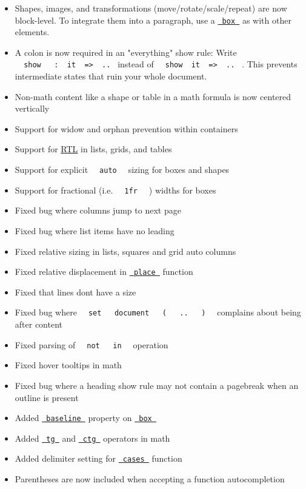 \begin{itemize}
\tightlist
\item
  Shapes, images, and transformations (move/rotate/scale/repeat) are now
  block-level. To integrate them into a paragraph, use a
  \href{/docs/reference/layout/box/}{\texttt{\ box\ }} as with other
  elements.
\item
  A colon is now required in an "everything" show rule: Write
  \texttt{\ }{\texttt{\ show\ }}\texttt{\ }{\texttt{\ :\ }}\texttt{\ it\ }{\texttt{\ =\textgreater{}\ }}\texttt{\ ..\ }
  instead of
  \texttt{\ }{\texttt{\ show\ }}\texttt{\ it\ }{\texttt{\ =\textgreater{}\ }}\texttt{\ ..\ }
  . This prevents intermediate states that ruin your whole document.
\item
  Non-math content like a shape or table in a math formula is now
  centered vertically
\item
  Support for widow and orphan prevention within containers
\item
  Support for \href{/docs/reference/text/text/\#parameters-dir}{RTL} in
  lists, grids, and tables
\item
  Support for explicit \texttt{\ }{\texttt{\ auto\ }}\texttt{\ } sizing
  for boxes and shapes
\item
  Support for fractional (i.e. \texttt{\ }{\texttt{\ 1fr\ }}\texttt{\ }
  ) widths for boxes
\item
  Fixed bug where columns jump to next page
\item
  Fixed bug where list items have no leading
\item
  Fixed relative sizing in lists, squares and grid auto columns
\item
  Fixed relative displacement in
  \href{/docs/reference/layout/place/}{\texttt{\ place\ }} function
\item
  Fixed that lines don\textquotesingle t have a size
\item
  Fixed bug where
  \texttt{\ }{\texttt{\ set\ }}\texttt{\ }{\texttt{\ document\ }}\texttt{\ }{\texttt{\ (\ }}\texttt{\ }{\texttt{\ ..\ }}\texttt{\ }{\texttt{\ )\ }}\texttt{\ }
  complains about being after content
\item
  Fixed parsing of
  \texttt{\ }{\texttt{\ not\ }}\texttt{\ }{\texttt{\ in\ }}\texttt{\ }
  operation
\item
  Fixed hover tooltips in math
\item
  Fixed bug where a heading show rule may not contain a pagebreak when
  an outline is present
\item
  Added
  \href{/docs/reference/layout/box/\#parameters-baseline}{\texttt{\ baseline\ }}
  property on \href{/docs/reference/layout/box/}{\texttt{\ box\ }}
\item
  Added \href{/docs/reference/math/op/}{\texttt{\ tg\ }} and
  \href{/docs/reference/math/op/}{\texttt{\ ctg\ }} operators in math
\item
  Added delimiter setting for
  \href{/docs/reference/math/cases/}{\texttt{\ cases\ }} function
\item
  Parentheses are now included when accepting a function autocompletion
\end{itemize}

